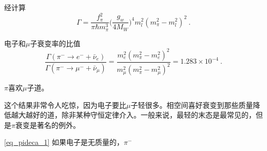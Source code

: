 经计算
\begin{equation}\label{eq_pideca_1}
\Gamma = \frac{f_\pi^2}{\pi \hbar m_\pi^3} \bigg( \frac{g_w}{4 M_W} \bigg)^4 m_l^2 (m_\pi^2 - m_l^2)^2 ~.
\end{equation}

电子和$\mu$子衰变率的比值
\begin{equation}
\frac{\Gamma(\pi^- \rightarrow e^- +\bar \nu_e)}{\Gamma(\pi^- \rightarrow \mu^- +\bar \nu_\mu)} = \frac{m_e^2(m_\pi^2-m_e^2)^2}{m_\mu^2(m_\pi^2-m_\mu^2)^2} = 1.283 \times 10^{-4}~.
\end{equation}

$\pi$喜欢$\mu$子道。

这个结果非常令人吃惊，因为电子要比$\mu$子轻很多。相空间喜好衰变到那些质量降低越大越好的道，除非某种守恒定律介入。一般来说，最轻的末态是最常见的，但是$\pi$衰变是著名的例外。

\autoref{eq_pideca_1} 如果电子是无质量的，$\pi^- $
